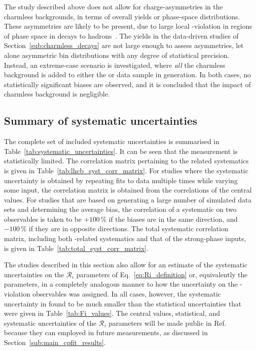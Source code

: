 The study described above does not allow for charge-asymmetries in the charmless backgrounds, in terms of overall yields or phase-space distributions. These asymmetries are likely to be present, due to large local \CP-violation in regions of phase space in \Bpm decays to hadrons~\cite{LHCB-PAPER-2014-044,LHCB-PAPER-2019-018}. The yields in the data-driven studies of Section~\ref{sub:charmless_decays} are not large enough to assess asymmetries, let alone asymmetric bin distributions with any degree of statistical precision. Instead, an extreme-case scenario is investigated, where \emph{all} the charmless background is added to either the \Bp or \Bm data sample in generation. In both cases, no statistically significant biases are observed, and it is concluded that the impact of charmless background is negligible.



\subsection{Summary of systematic uncertainties} %
\label{sub:summary_of_systematic_uncertainties}

The complete set of included systematic uncertainties is summarised in Table~\ref{tab:systematic_uncertainties}. It can be seen that the measurement is statistically limited. The correlation matrix pertaining to the \lhcb related systematics is given in Table~\ref{tab:lhcb_syst_corr_matrix}. For studies where the systematic uncertainty is obtained by repeating fits to data multiple times while varying some input, the correlation matrix is obtained from the correlations of the central values. For studies that are based on generating a large number of simulated data sets and determining the average bias, the correlation of a systematic on two observables is taken to be $+100\,\%$ if the biases are in the same direction, and $-100\,\%$ if they are in opposite directions. The total systematic correlation matrix, including both \lhcb-related systematics and that of the strong-phase inputs, is given in Table~\ref{tab:total_syst_corr_matrix}.





The studies described in this section also allow for an estimate of the systematic uncertainties on the $\mathcal R_i$ parameters of Eq.~\eqref{eq:Ri_definition} or, equivalently the \Fi parameters, in a completely analogous manner to how the uncertainty on the \CP-violation observables was assigned. In all cases, however, the systematic uncertainty in found to be much smaller than the statistical uncertainties that were given in Table~\ref{tab:Fi_values}. The central values, statistical, and systematic uncertainties of the $\mathcal R_i$ parameters will be made public in Ref.~\cite{GGSZ-B2Dh} because they can employed in future \lhcb measurements, as discussed in Section~\ref{sub:main_cpfit_results}.

